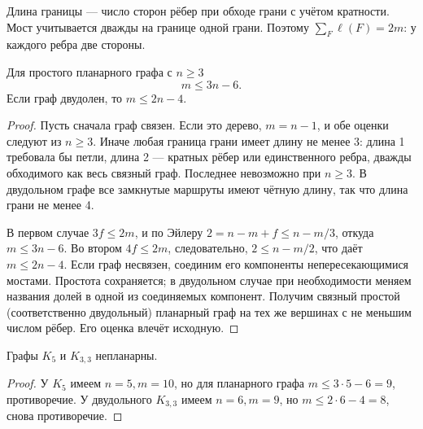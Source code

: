 \begin{definition}
Длина границы — число сторон рёбер при обходе грани с учётом кратности.
Мост учитывается дважды на границе одной грани. Поэтому
\(\sum_F \ell(F)=2m\): у каждого ребра две стороны.
\end{definition}


\begin{lemma}
Для простого планарного графа с \(n\ge3\)
\[
 m\le3n-6.
\]
Если граф двудолен, то \(m\le2n-4\).
\end{lemma}
\begin{proof}
Пусть сначала граф связен. Если это дерево, \(m=n-1\), и обе оценки
следуют из \(n\ge3\). Иначе любая граница грани имеет длину не менее 3:
длина 1 требовала бы петли, длина 2 — кратных рёбер или единственного
ребра, дважды обходимого как весь связный граф. Последнее невозможно
при \(n\ge3\). В двудольном графе все замкнутые маршруты имеют чётную
длину, так что длина грани не менее 4.

В первом случае \(3f\le2m\), и по Эйлеру
\(2=n-m+f\le n-m/3\), откуда \(m\le3n-6\).
Во втором \(4f\le2m\), следовательно,
\(2\le n-m/2\), что даёт \(m\le2n-4\).
Если граф несвязен, соединим его компоненты непересекающимися мостами.
Простота сохраняется; в двудольном случае при необходимости меняем
названия долей в одной из соединяемых компонент. Получим связный
простой (соответственно двудольный) планарный граф на тех же вершинах
с не меньшим числом рёбер. Его оценка влечёт исходную.
\end{proof}
\begin{theorem}
Графы \(K_5\) и \(K_{3,3}\) непланарны.
\end{theorem}
\begin{proof}
У \(K_5\) имеем \(n=5,m=10\), но для планарного графа
\(m\le3\cdot5-6=9\), противоречие.
У двудольного \(K_{3,3}\) имеем \(n=6,m=9\), но
\(m\le2\cdot6-4=8\), снова противоречие.
\end{proof}
\begin{center}
\end{center}
